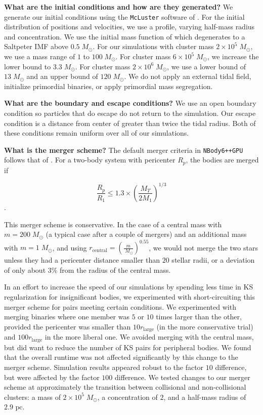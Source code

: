 \documentclass[preprint1]{aastex}
\newcommand\Msun{\; M_\odot}
\newcommand\pc{\mbox{ pc}}
\newcommand\nbody{\texttt{NBody6++GPU }}
\numberwithin{equation}{section}
\begin{document}
\textbf{What are the initial conditions and how are they generated?}
We generate our initial conditions using the \texttt{McLuster} software of \citet{2011Kupper}. For the initial distribution of positions and velocities, we use a \citet{1966King} profile, varying half-mass radius and concentration.  We use the initial mass function of \citet{2001Kroupa} which degenerates to a Saltpeter IMF above $0.5 \Msun$.  For our simulations with cluster mass $2 \times 10^5 \Msun$, we use a mass range of $1$ to $100 \Msun$.  For cluster mass $6 \times 10^5 \Msun$, we increase the lower bound to $3.3 \Msun$.  For cluster mass $2 \times 10^6 \Msun$, we use a lower bound of $13 \Msun$ and an upper bound of $120 \Msun$.  We do not apply an external tidal field, initialize primordial binaries, or apply primordial mass segregation. 

\textbf{What are the boundary and escape conditions?}
We use an open boundary condition so particles that do escape do not return to the simulation. Our escape condition is a distance from center of greater than twice the tidal radius. Both of these conditions remain uniform over all of our simulations.

\textbf{What is the merger scheme?}
The default merger criteria in \nbody follows that of \citet{1992Kochanek}.  For a two-body system with pericenter $R_p$, the bodies are merged if

$$ \frac{R_{p}}{R_{1}} \leq 1.3 \times (\frac{M_T}{2M_1})^{1/3} $$.

This merger scheme is conservative.  In the case of a central mass with $m = 200 \Msun$ (a typical case after a couple of mergers) and an additional mass with $m = 1 \Msun$, and using $r_{\mathrm{central}} = (\frac{m}{\Msun})^{0.55}$, we would not merge the two stars unless they had a pericenter distance smaller than $20$ stellar radii, or a deviation of only about $3\%$ from the radius of the central mass.

In an effort to increase the speed of our simulations by spending less time in KS regularization for insignificant bodies, we experimented with short-circuiting this merger scheme for pairs meeting certain conditions.  We experimented with merging binaries where one member was $5$ or $10$ times larger than the other, provided the pericenter was smaller than $10 r_\mathrm{large}$ (in the more conservative trial) and $100 r_\mathrm{large}$ in the more liberal one.  We avoided merging with the central mass, but did want to reduce the number of KS pairs for peripheral bodies. We found that the overall runtime was not affected significantly by this change to the merger scheme. Simulation results appeared robust to the factor $10$ difference, but were affected by the factor $100$ difference.  We tested changes to our merger scheme at approximately the transition between collisional and non-collisional clusters: a mass of $2 \times 10^5 \Msun$, a concentration of $2$, and a half-mass radius of $2.9 \pc$.
\end{document}
